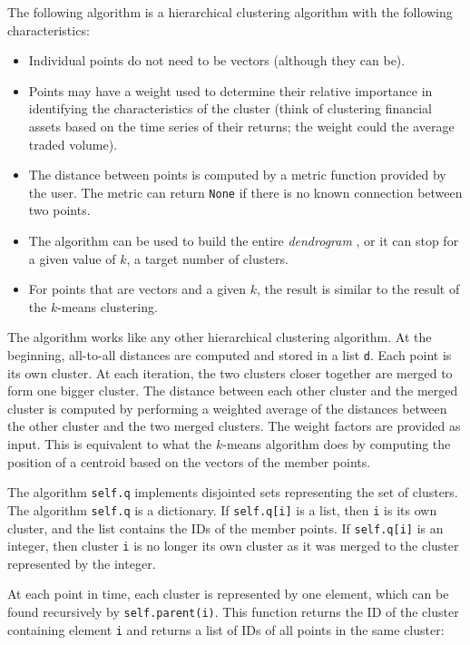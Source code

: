 \documentclass[justified, sixbynine]{tufte-book}
\def\ft{\small\tt}
\theoremstyle{plain}%
\newtheorem * {corollary}{Corollary}
\theoremstyle{definition}
\theoremstyle{remark}
\newtheorem * {remark}{Remark}
\newtheorem * {note}{Note}
\begin{document}
\begin{fullwidth}
The following algorithm is a hierarchical clustering algorithm with the following characteristics:

\begin{itemize}
\item Individual points do not need to be vectors (although they can be).
\item Points may have a weight used to determine their relative importance in identifying the characteristics of the cluster (think of clustering financial assets based on the time series of their returns; the weight could the average traded volume).
\item The distance between points is computed by a metric function provided by the user. The metric can return {\ft None} if there is no known connection between two points.
\item The algorithm can be used to build the entire {\it dendrogram} , or it can stop for a given value of $k$, a target number of clusters.
\item For points that are vectors and a given $k$, the result is similar to the result of the $k$-means clustering.
\end{itemize}

The algorithm works like any other hierarchical clustering algorithm. At the beginning, all-to-all distances are computed and stored in a list {\ft d}. Each point is its own cluster. At each iteration, the two clusters closer together are merged to form one bigger cluster. The distance between each other cluster and the merged cluster is computed by performing a weighted average of the distances between the other cluster and the two merged clusters. The weight factors are provided as input. This is equivalent to what the $k$-means algorithm does by computing the position of a centroid based on the vectors of the member points.

The algorithm {\ft self.q} implements disjointed sets representing the set of clusters. The algorithm {\ft self.q} is a dictionary. If {\ft self.q[i]} is a list, then {\ft i} is its own cluster, and the list contains the IDs of the member points. If  {\ft self.q[i]} is an integer, then cluster {\ft i} is no longer its own cluster as it was merged to the cluster represented by the integer.

At each point in time, each cluster is represented by one element, which can be found recursively by {\ft self.parent(i)}. This function returns the ID of the cluster containing element {\ft i} and returns a list of IDs of all points in the same cluster:


\end{fullwidth}
\end{document}
